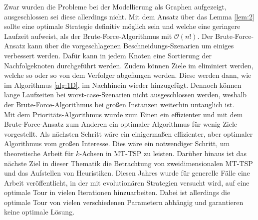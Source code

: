 \documentclass[german,version-2019-11]{uzl-thesis}
\begin{document}
\noindent
Zwar wurden die Probleme bei der Modellierung als Graphen aufgezeigt, ausgeschlossen sei diese allerdings nicht. Mit dem Ansatz über das Lemma \ref{lem:2} sollte eine optimale Strategie definitiv möglich sein und welche eine geringere Laufzeit aufweist, als der Brute-Force-Algorithmus mit $\mathcal{O}(n!)$. Der Brute-Force-Ansatz kann über die vorgeschlagenen Beschneidungs-Szenarien um einiges verbessert werden. Dafür kann in jedem Knoten eine Sortierung der Nachfolgeknoten durchgeführt werden. Zudem können Ziele im eliminiert werden, welche so oder so von dem Verfolger abgefangen werden. Diese werden dann, wie im  Algorithmus \ref{alg:1D}, im Nachhinein wieder hinzugefügt. Dennoch können lange Laufzeiten bei worst-case-Szenarien nicht ausgeschlossen werden, weshalb der Brute-Force-Algorithmus bei großen Instanzen weiterhin  untauglich ist. \\
Mit dem Prioritäts-Algorithmus wurde zum Einen ein effizienter und mit dem Brute-Force-Ansatz zum Anderen ein optimaler Algorithmus für wenig Ziele vorgestellt. Als nächsten Schritt wäre ein einigermaßen effizienter, aber optimaler Algorithmus vom großen Interesse. Dies wäre ein notwendiger Schritt, um theoretische Arbeit für $k$-Achsen in MT-TSP zu leisten. Darüber hinaus ist das nächste Ziel in dieser Thematik die Betrachtung von zweidimensionalen MT-TSP und das Aufstellen von Heuristiken.
Diesen Jahres wurde für generelle Fälle eine Arbeit \cite{moraes} veröffentlicht, in der mit evolutionären Strategien versucht wird, auf eine optimale Tour in vielen Iterationen hinzuarbeiten. Dabei ist allerdings die optimale Tour von vielen verschiedenen Parametern abhängig und garantieren keine optimale Lösung. 
\end{document}

